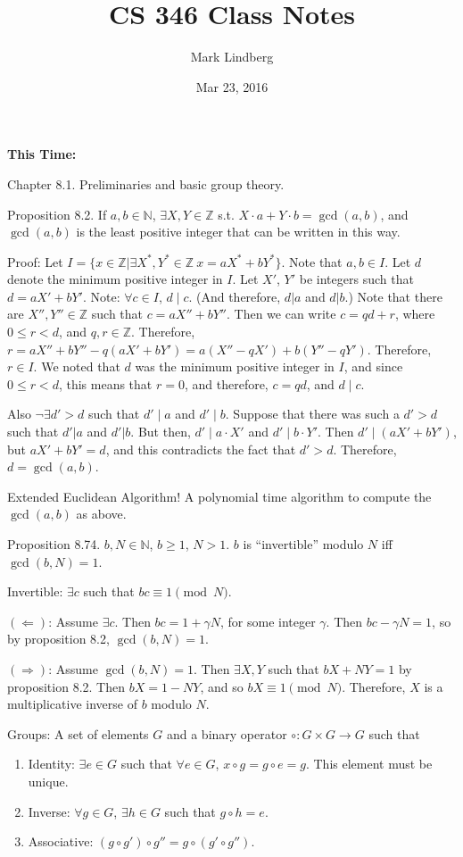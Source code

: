 \documentclass[12pt]{article}
\newcommand{\Z}{\mathbb{Z}}
\newcommand{\N}{\mathbb{N}}
\begin{document}
\title{CS 346 Class Notes}
\date{Mar 23, 2016}
\author{Mark Lindberg}
\maketitle
\thispagestyle{fancy}

{\bf This Time:}

Chapter 8.1. Preliminaries and basic group theory.

Proposition 8.2. If $a,b\in\N$, $\exists X,Y\in\Z$ s.t. $X\cdot a+Y\cdot b=\gcd(a,b)$, and $\gcd(a,b)$ is the least positive integer that can be written in this way.

Proof: Let $I=\{x\in\Z|\exists X^*,Y^*\in\Z\ x=aX^*+bY^*\}$. Note that $a,b\in I$. Let $d$ denote the minimum positive integer in $I$. Let $X'$, $Y'$ be integers such that $d=aX'+bY'$. Note: $\forall c\in I$, $d\mid c$. (And therefore, $d|a$ and $d|b$.) Note that there are $X'',Y''\in\Z$ such that $c=aX''+bY''$. Then we can write $c=qd+r$, where $0\leq r < d$, and $q,r\in\Z$. Therefore, $r=aX''+bY''-q(aX'+bY')=a(X''-qX')+b(Y''-qY')$. Therefore, $r\in I$. We noted that $d$ was the minimum positive integer in $I$, and since $0\leq r < d$, this means that $r=0$, and therefore, $c=qd$, and $d\mid c$.

Also $\neg\exists d'>d$ such that $d'\mid a$ and $d'\mid b$. Suppose that there was such a $d'>d$ such that $d'|a$ and $d'|b$. But then, $d'\mid a\cdot X'$ and $d'\mid b\cdot Y'$. Then $d'\mid(aX'+bY')$, but $aX'+bY'=d$, and this contradicts the fact that $d'>d$. Therefore, $d=\gcd(a,b)$.

Extended Euclidean Algorithm! A polynomial time algorithm to compute the $\gcd(a,b)$ as above.

Proposition 8.74. $b,N\in\N$, $b\geq 1$, $N>1$. $b$ is ``invertible'' modulo $N$ iff $\gcd(b,N)=1$.

Invertible: $\exists c$ such that $bc\equiv1\pmod{N}$.

$(\Leftarrow)$: Assume $\exists c$. Then $bc=1+\gamma N$, for some integer $\gamma$. Then $bc-\gamma N=1$, so by proposition 8.2, $\gcd(b,N)=1$.

$(\Rightarrow)$: Assume $\gcd(b,N)=1$. Then $\exists X,Y$ such that $bX+NY=1$ by proposition 8.2. Then $bX=1-NY$, and so $bX\equiv1\pmod{N}$. Therefore, $X$ is a multiplicative inverse of $b$ modulo $N$.

Groups: A set of elements $G$ and a binary operator $\circ:G\times G\to G$ such that\begin{enumerate}

\item Identity: $\exists e\in G$ such that $\forall e\in G$, $x\circ g=g\circ e=g$. This element must be unique.

\item Inverse: $\forall g\in G$, $\exists h\in G$ such that $g\circ h=e$.

\item Associative: $(g\circ g')\circ g''=g\circ(g'\circ g'')$.

\end{enumerate}
\end{document}
